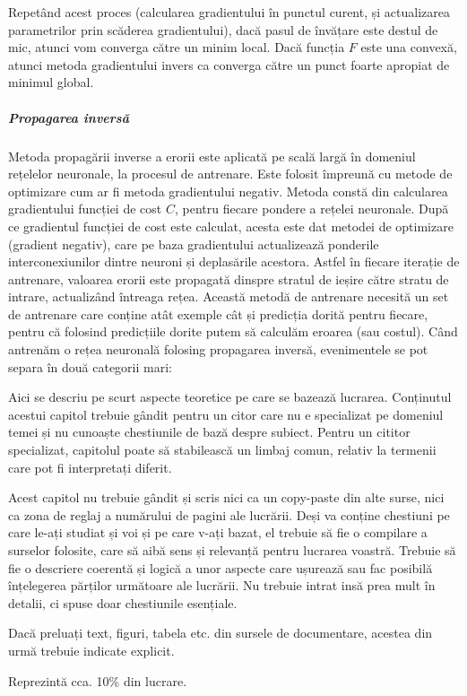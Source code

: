 Repetând acest proces (calcularea gradientului în punctul curent, și actualizarea parametrilor prin scăderea gradientului), dacă pasul de învățare este destul de mic, atunci vom converga către un minim local. Dacă funcția $F$ este una convexă, atunci metoda gradientului invers ca converga către un punct foarte apropiat de minimul global.

\subparagraph{Propagarea inversă}
Metoda propagării inverse a erorii este aplicată pe scală largă în domeniul rețelelor neuronale, la procesul de antrenare. Este folosit împreună cu metode de optimizare cum ar fi metoda gradientului negativ.\newline
Metoda constă din calcularea gradientului funcției de cost $C$, pentru fiecare pondere a rețelei neuronale. După ce gradientul funcției de cost este calculat, acesta este dat metodei de optimizare (gradient negativ), care pe baza gradientului actualizează ponderile interconexiunilor dintre neuroni și deplasările acestora. Astfel în fiecare iterație de antrenare, valoarea erorii este propagată dinspre stratul de ieșire către stratu de intrare, actualizând întreaga rețea.\newline
Această metodă de antrenare necesită un set de antrenare care conține atât exemple cât și predicția dorită pentru fiecare, pentru că folosind predicțiile dorite putem să calculăm eroarea (sau costul). Când antrenăm o rețea neuronală folosing propagarea inversă, evenimentele se pot separa în două categorii mari:



\label{cap:fund-teoretice}

Aici se descriu pe scurt aspecte teoretice pe care se bazează lucrarea. Conținutul acestui capitol trebuie gândit pentru un citor care nu e specializat pe domeniul temei și nu cunoaște chestiunile de bază despre subiect. Pentru un cititor specializat, capitolul poate să stabilească un limbaj comun, relativ la termenii care pot fi interpretați diferit. 

Acest capitol nu trebuie gândit și scris nici ca un copy-paste din alte surse, nici ca zona de reglaj a numărului de pagini ale lucrării. Deși va conține chestiuni pe care le-ați studiat și voi și pe care v-ați bazat, el trebuie să fie o compilare a surselor folosite, care să aibă sens și relevanță pentru lucrarea voastră. Trebuie să fie o descriere coerentă și logică a unor aspecte care ușurează sau fac posibilă înțelegerea părților următoare ale lucrării. Nu trebuie intrat insă prea mult în detalii, ci spuse doar chestiunile esențiale. 

Dacă preluați text, figuri, tabela etc. din sursele de documentare, acestea din urmă trebuie indicate explicit. 

Reprezintă cca. 10\% din lucrare.